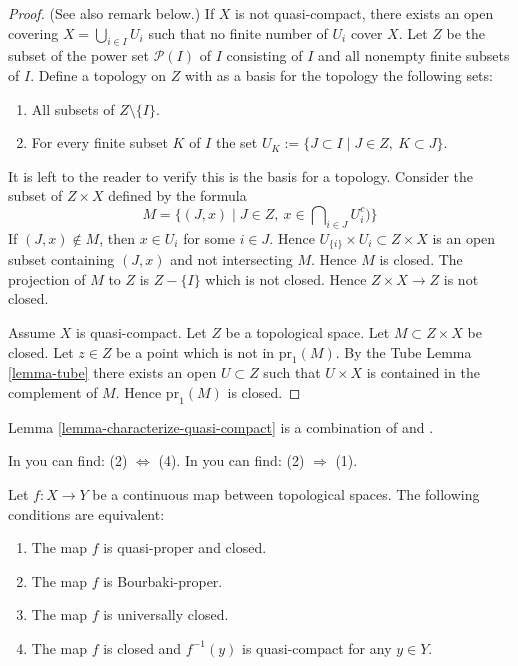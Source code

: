 \begin{proof}
(See also remark below.)
If $X$ is not quasi-compact, there exists an open covering
$X = \bigcup_{i \in I} U_i$ such that no finite
number of $U_i$ cover $X$.
Let $Z$ be the subset of the power set $\mathcal{P}(I)$ of $I$
consisting of $I$ and all nonempty finite subsets of $I$.
Define a topology on $Z$ with as a basis for the topology
the following sets:
\begin{enumerate}
\item All subsets of $Z\setminus\{I\}$.
\item For every finite subset $K$ of $I$ the set
$U_K := \{J\subset I \mid J \in Z, \ K\subset J \}$.
\end{enumerate}
It is left to the reader to verify this is the basis for a topology.
Consider the subset of $Z \times X$ defined by the formula
$$
M = \{(J, x) \mid J \in Z, \ x \in \bigcap\nolimits_{i \in J} U_i^c)\}
$$
If $(J, x) \not \in M$, then $x \in U_i$ for some $i \in J$.
Hence $U_{\{i\}} \times U_i \subset Z \times X$ is an open
subset containing $(J, x)$ and not intersecting $M$. Hence
$M$ is closed. The projection of $M$ to $Z$ is $Z-\{I\}$
which is not closed. Hence $Z \times X \to Z$ is not closed.

\medskip\noindent
Assume $X$ is quasi-compact. Let $Z$ be a topological space.
Let $M \subset  Z \times X$ be closed. Let $z \in Z$ be a point
which is not in $\text{pr}_1(M)$. By the Tube Lemma \ref{lemma-tube}
there exists an open $U \subset Z$ such that $U \times X$ is
contained in the complement of $M$. Hence $\text{pr}_1(M)$ is closed.
\end{proof}

\begin{remark}
\label{remark-lemma-literature}
Lemma \ref{lemma-characterize-quasi-compact} is a combination of
\cite[I, p. 75, Lemme 1]{Bourbaki} and
\cite[I, p. 76, Corollaire 1]{Bourbaki}.
\end{remark}

\begin{theorem}
\label{theorem-characterize-proper}
\begin{reference}
In \cite[I, p. 75, Theorem 1]{Bourbaki} you can find:
(2) $\Leftrightarrow$ (4).
In \cite[I, p. 77, Proposition 6]{Bourbaki} you can find:
(2) $\Rightarrow$ (1).
\end{reference}
Let $f: X\to Y$ be a continuous map between
topological spaces. The following conditions are equivalent:
\begin{enumerate}
\item The map $f$ is quasi-proper and closed.
\item The map $f$ is Bourbaki-proper.
\item The map $f$ is universally closed.
\item The map $f$ is closed and $f^{-1}(y)$ is quasi-compact for any
$y\in Y$.
\end{enumerate}
\end{theorem}

